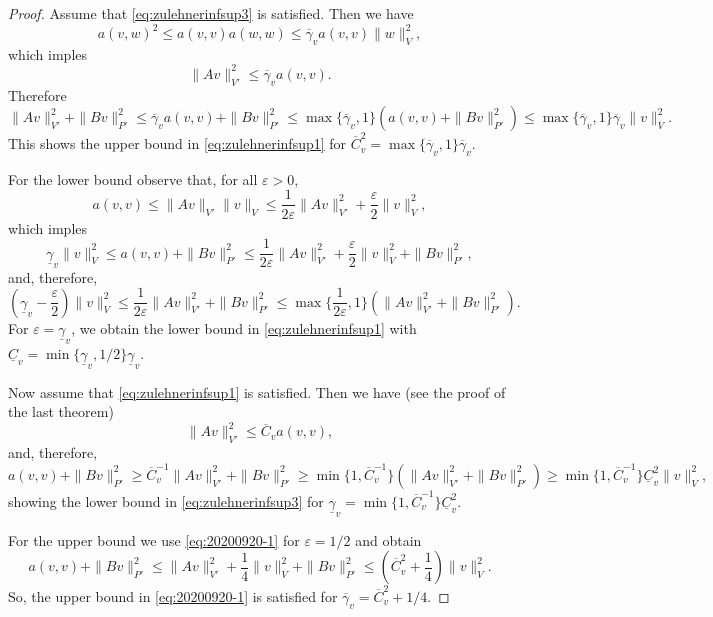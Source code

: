 \begin{proof}
Assume that \eqref{eq:zulehnerinfsup3} is satisfied. Then we have
\[
a(v,w)^2\leq a(v,v)a(w,w)\leq \overline{\gamma}_va(v,v)\|w\|_V^2,
\]
which imples
\[
\|Av\|_{V'}^2\leq \overline{\gamma}_va(v,v).
\]
Therefore
\[
\|Av\|_{V'}^2 + \|Bv\|_{P'}^2\leq \overline{\gamma}_va(v,v)+\|Bv\|_{P'}^2\leq \max\{\overline{\gamma}_v, 1\}(a(v,v)+\|Bv\|_{P'}^2)\leq \max\{\overline{\gamma}_v, 1\}\overline{\gamma}_v\|v\|_{V}^2.
\]
This shows the upper bound in \eqref{eq:zulehnerinfsup1} for $\overline{C}_v^2=\max\{\overline{\gamma}_v, 1\}\overline{\gamma}_v$. 

For the lower bound observe that, for all $\varepsilon>0$,
\begin{equation}\label{eq:20200920-1}
a(v,v)\leq\|Av\|_{V'}\|v\|_V\leq\frac{1}{2\varepsilon}\|Av\|_{V'}^2 + \frac{\varepsilon}{2}\|v\|_V^2,
\end{equation}
which imples
\[
\underline{\gamma}_v\|v\|_V^2\leq a(v,v)+\|Bv\|_{P'}^2\leq\frac{1}{2\varepsilon}\|Av\|_{V'}^2 + \frac{\varepsilon}{2}\|v\|_V^2+\|Bv\|_{P'}^2,
\]
and, therefore,
\[
\left(\underline{\gamma}_v-\frac{\varepsilon}{2}\right)\|v\|_V^2 \leq \frac{1}{2\varepsilon}\|Av\|_{V'}^2 + \|Bv\|_{P'}^2 \leq \max\{\frac{1}{2\varepsilon},1\}(\|Av\|_{V'}^2 + \|Bv\|_{P'}^2).
\]
For $\varepsilon=\underline{\gamma}_v$, we obtain the lower bound in \eqref{eq:zulehnerinfsup1}  with $\underline{C}_v=\min\{\underline{\gamma}_v,1/2\}\underline{\gamma}_v$.

Now assume that \eqref{eq:zulehnerinfsup1} is satisfied. Then we have (see the proof of the last theorem)
\[
\|Av\|_{V'}^2\leq\overline{C}_va(v,v),
\]
and, therefore,
\[
a(v,v)+\|Bv\|_{P'}^2\geq\overline{C}_v^{-1}\|Av\|_{V'}^2+\|Bv\|_{P'}^2\geq \min\{1, \overline{C}_v^{-1}\}(\|Av\|_{V'}^2+\|Bv\|_{P'}^2)\geq \min\{1, \overline{C}_v^{-1}\}\underline{C}_v^2\|v\|_{V}^2,
\]
showing the lower bound in \eqref{eq:zulehnerinfsup3} for $\underline{\gamma}_v=\min\{1, \overline{C}_v^{-1}\}\underline{C}_v^2$.

For the upper bound we use \eqref{eq:20200920-1} for $\varepsilon=1/2$ and obtain
\[
a(v, v)+\|Bv\|_{P'}^2\leq \|Av\|_{V'}^2+\frac{1}{4}\|v\|_V^2+\|Bv\|_{P'}^2\leq \left(\overline{C}_v^2+\frac{1}{4}\right)\|v\|_V^2.
\]
So, the upper bound in \eqref{eq:20200920-1} is satisfied for $\overline{\gamma}_v=\overline{C}_v^2+1/4$.
\end{proof}

